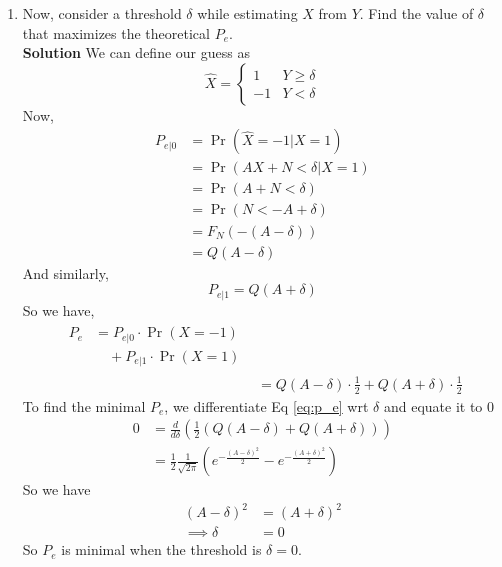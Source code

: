 \documentclass[journal, 12pt, twocolumn]{IEEEtran}
\providecommand{\pr}[1]{\ensuremath{\Pr\left(#1\right)}}
\begin{document}
\begin{enumerate}[label=\arabic{section}.\arabic*]
    \item
        Now, consider a threshold $\delta$ while estimating $X$ from $Y$. Find the value of $\delta$
        that maximizes the theoretical $P_e$.
        \\
        \textbf{Solution} We can define our guess as
        \begin{equation}
            \hat{X} = \begin{cases}
                1 & Y \geq \delta \\
                -1 & Y < \delta
            \end{cases}
        \end{equation}
        Now,
        \begin{align}
            P_{e|0} &= \pr{\hat{X} = -1 | X = 1} \\
            &= \pr{AX + N < \delta | X = 1} \\
            &= \pr{A + N < \delta} \\
            &= \pr{N < -A + \delta} \\
            &= F_N(-(A - \delta)) \\
            &= Q(A - \delta)
        \end{align}
        And similarly,
        \begin{equation}
            P_{e|1} = Q(A + \delta)
        \end{equation}
        So we have,
        \begin{align}
        \begin{split}
            P_e &= P_{e|0} \cdot \pr{X = -1} \\
            &\quad+ P_{e|1} \cdot \pr{X = 1}
        \end{split} \\
            &= Q(A - \delta) \cdot \frac{1}{2} + Q(A + \delta) \cdot \frac{1}{2} \label{eq:p_e}
        \end{align}
        To find the minimal $P_e$, we differentiate Eq \eqref{eq:p_e} wrt $\delta$ and equate it to
        0
        \begin{align}
            0 &= \frac{d}{d\delta}\left(\frac{1}{2}\left(Q(A-\delta) + Q(A+\delta)\right)\right) \\
            &= \frac{1}{2} \frac{1}{\sqrt{2\pi}}
                \left(e^{-\frac{(A-\delta)^2}{2}} - e^{-\frac{(A+\delta)^2}{2}}\right)
        \end{align}
        So we have
        \begin{align}
            (A - \delta)^2 &= (A + \delta)^2 \\
            \implies \delta &= 0
        \end{align}
        So $P_e$ is minimal when the threshold is $\delta = 0$.


\end{enumerate}
\end{document}

